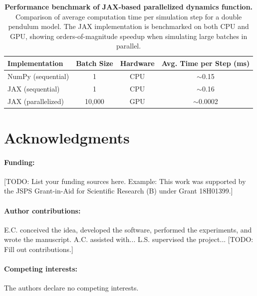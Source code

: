 \documentclass[12pt]{article}
\begin{document}

\begin{table}
	\centering
	\caption{\textbf{Performance benchmark of JAX-based parallelized dynamics function.}
    Comparison of average computation time per simulation step for a double pendulum model. The JAX implementation is benchmarked on both CPU and GPU, showing orders-of-magnitude speedup when simulating large batches in parallel.}
	\label{tab:jax_performance}
	
	\begin{tabular}{lccc}
		\\
		\hline
		Implementation & Batch Size & Hardware & Avg. Time per Step (ms) \\
		\hline
		NumPy (sequential) & 1 & CPU & $\sim$0.15 \\
		JAX (sequential) & 1 & CPU & $\sim$0.16 \\
		JAX (parallelized) & 10,000 & GPU & $\sim$0.0002 \\
		\hline
	\end{tabular}
\end{table}



\clearpage %





\section*{Acknowledgments}
\paragraph*{Funding:}
[TODO: List your funding sources here. Example: This work was supported by the JSPS Grant-in-Aid for Scientific Research (B) under Grant 18H01399.]
\paragraph*{Author contributions:}
E.C. conceived the idea, developed the software, performed the experiments, and wrote the manuscript. A.C. assisted with... L.S. supervised the project... [TODO: Fill out contributions.]
\paragraph*{Competing interests:}
The authors declare no competing interests.
\end{document}

